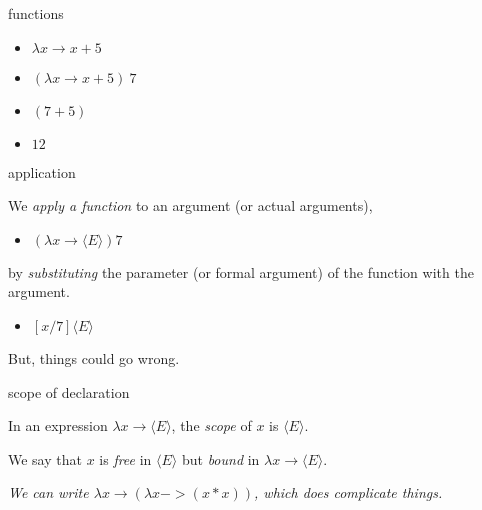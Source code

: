 \begin{frame}{functions}
  \begin{itemize}
   \pause \item $\lambda x \rightarrow x + 5$
   \pause \item $(\lambda x \rightarrow x + 5) \ 7$
   \pause \item $(7 + 5)$
   \pause \item $12$
  \end{itemize}
\end{frame}

\begin{frame}{application}

We {\em apply a function} to an argument (or actual arguments),
\vspace{10pt}

  \begin{itemize}
   \pause \item $(\lambda x \rightarrow \langle E \rangle) 7$
  \end{itemize}

\pause\vspace{10pt}
by {\em substituting} the parameter (or formal argument) of the function with the argument.

\pause\vspace{10pt}
  \begin{itemize}
   \pause \item $[x/7]\langle E \rangle$
  \end{itemize}


\pause\vspace{20pt}

But, things could go wrong.

\end{frame}

\begin{frame}{scope of declaration}

\pause

  In an expression $\lambda x \rightarrow  \langle E \rangle$, the {\em scope} of $x$
  is $\langle E \rangle$. 

\pause\vspace{10pt}

  We say that $x$ is {\em free} in $\langle E \rangle$ but {\em bound} in
  $\lambda x \rightarrow \langle E \rangle$.

\pause\vspace{60pt}

{\em We can write $\lambda x \rightarrow ( \lambda x -> (x*x))$, which does complicate things.}

\end{frame}


